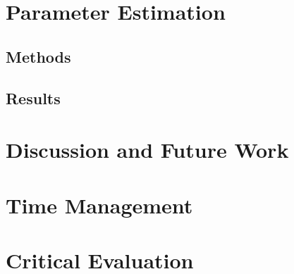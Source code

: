 \documentclass[12pt,a4paper,titlepage]{article}
\begin{document}





\section{Parameter Estimation}











\subsection{Methods}

\subsection{Results}

\section{Discussion and Future Work}

\newpage

\appendix
\section{Time Management}
\section{Critical Evaluation}
\end{document}
